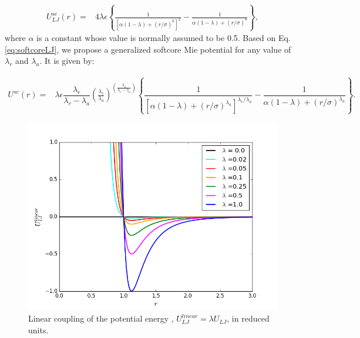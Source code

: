     \begin{equation}
    \label{eq:softcoreLJ}
    \begin{aligned}
    U_{LJ}^{sc}(r) {}=& 4\lambda\epsilon \left\lbrace\frac{1}{\left[\alpha(1-\lambda)+ (r/\sigma)^{6}\right]^{2}} - \frac{1}{\alpha(1-\lambda)+(r/\sigma)^{6}}\right\rbrace ,
    \end{aligned}
    \end{equation}
    where $\alpha$ is a constant whose value is  normally assumed to be 0.5.    Based on Eq. \ref{eq:softcoreLJ}, we propose a generalized softcore Mie potential for any value of $\lambda _{r}$ and $\lambda _{a}$. It is given by:
    
    \begin{equation}
    \label{eq:softcore}
    \begin{aligned}
    U^{sc}(r) {}=& \lambda\epsilon\dfrac{\lambda_r}{\lambda_r - \lambda_a} \left(\frac{\lambda_r}{\lambda_a} \right)^{\left( \frac{\lambda_a}{\lambda_r - \lambda_a} \right)} \left\lbrace\dfrac{1}{\left[\alpha(1-\lambda)+ (r/\sigma)^{\lambda_a}\right]^{\lambda_{r}/\lambda_{a}}} - \dfrac{1}{\alpha(1-\lambda)+(r/\sigma)^{\lambda_a}}\right\rbrace .
    \end{aligned}
    \end{equation}
    
    \begin{figure}[H]
    	\centering
    	\includegraphics[width=0.9\linewidth]{Figures/linear}
    	\caption{Linear coupling of the potential energy , $U^{linear}_{LJ} = \lambda U_{LJ}$, in reduced units.}
    	\label{fig:linearpoten}
    \end{figure}    
    
